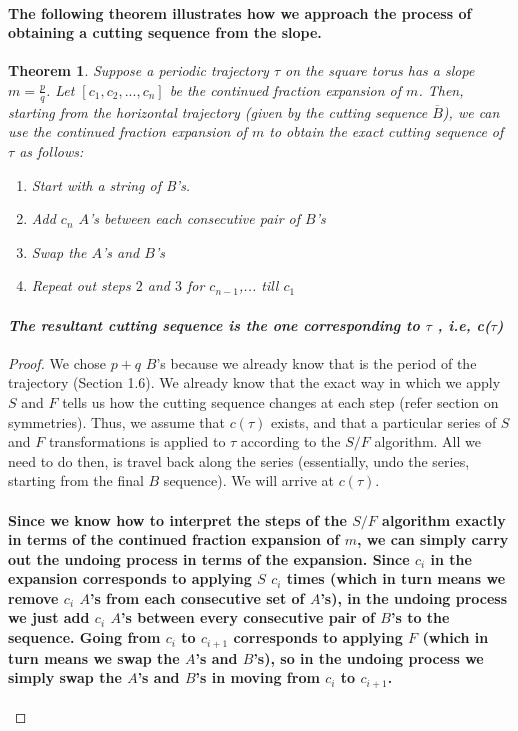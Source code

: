 \documentclass{report}
\newtheorem{theorem}{Theorem}[chapter]
\begin{document}
\paragraph{The following theorem illustrates how we approach the process of obtaining a cutting sequence from the slope.}

\begin{theorem}
{Suppose a periodic trajectory $\tau$ on the square torus has a slope $m=\frac{p}{q}$. Let $[c_1, c_2,..., c_n]$ be the continued fraction expansion of $m$. Then, starting from the horizontal trajectory (given by the cutting sequence $\overline{B}$), we can use the continued fraction expansion of $m$ to obtain the exact cutting sequence of $\tau$ as follows:

\begin{enumerate}
\item  { \textit{Start with a string of B’s.}}

\item  { \textit{Add $c_n$ $A$’s between each consecutive pair of $B$’s}}

\item  { \textit{Swap the $A$’s and $B$’s}}

\item  { \textit{Repeat out steps $2$ and $3$ for $c_{n-1}$,... till $c_1$}}
\end{enumerate}

\paragraph{\textit{The resultant cutting sequence is the one corresponding to $\tau$ , i.e, c($\tau$)}}}
\end{theorem}

\begin{proof}
{We chose $p+q$ $B$’s because we already know that is the period of the trajectory (Section 1.6). We already know that the exact way in which we apply $S$ and $F$ tells us how the cutting sequence changes at each step (refer section on symmetries). Thus, we assume that $c(\tau)$ exists, and that a particular series of $S$ and $F$ transformations is applied to $\tau$ according to the $S/F$ algorithm. All we need to do then, is travel back along the series (essentially, undo the series, starting from the final $B$ sequence). We will arrive at $c(\tau)$.

\paragraph{Since we know how to interpret the steps of the $S/F$ algorithm exactly in terms of the continued fraction expansion of $m$, we can simply carry out the undoing process in terms of the expansion. Since $c_i$ in the expansion corresponds to applying $S$ $c_i$ times (which in turn means we remove $c_i$ $A$’s from each consecutive set of $A$’s), in the undoing process we just add $c_i$ $A$’s between every consecutive pair of $B$’s to the sequence. Going from $c_i$ to $c_{i+1}$ corresponds to applying $F$ (which in turn means we swap the $A$’s and $B$’s), so in the undoing process we simply swap the $A$’s and $B$’s in moving from  $c_i$ to $c_{i+1}$.}}
\end{proof}
\end{document}
